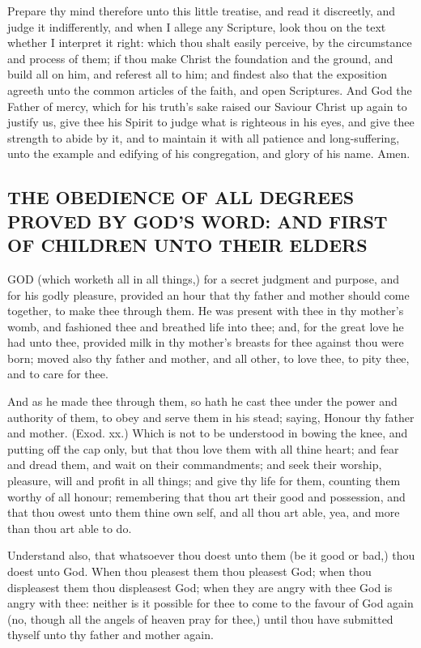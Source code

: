 Prepare thy mind therefore unto this little treatise, and 
read it discreetly, and judge it indifferently, and when I
allege any Scripture, look thou on the text whether I interpret
it right: which thou shalt easily perceive, by the circumstance
and process of them; if thou make Christ the 
foundation and the ground, and build all on him, and referest
all to him; and findest also that the exposition 
agreeth unto the common articles of the faith, and open 
Scriptures. And God the Father of mercy, which for his 
truth's sake raised our Saviour Christ up again to justify 
us, give thee his Spirit to judge what is righteous in his 
eyes, and give thee strength to abide by it, and to maintain
it with all patience and long-suffering, unto the 
example and edifying of his congregation, and glory of his 
name. Amen. 


\subsection*{THE OBEDIENCE OF ALL DEGREES PROVED BY GOD'S WORD: AND FIRST OF
CHILDREN UNTO THEIR ELDERS}

GOD (which worketh all in all things,) for a secret 
judgment and purpose, and for his godly pleasure, 
provided an hour that thy father and mother should come 
together, to make thee through them. He was present 
with thee in thy mother's womb, and fashioned thee 
and breathed life into thee; and, for the great love he had 
unto thee, provided milk in thy mother's breasts for thee 
against thou were born; moved also thy father and 
mother, and all other, to love thee, to pity thee, and to 
care for thee. 

And as he made thee through them, so hath he cast thee 
under the power and authority of them, to obey and serve 
them in his stead; saying, Honour thy father and mother. 
(Exod. xx.) Which is not to be understood in bowing 
the knee, and putting off the cap only, but that thou love 
them with all thine heart; and fear and dread them, and 
wait on their commandments; and seek their worship,
pleasure, will and profit in all things; and give thy life for 
them, counting them worthy of all honour; remembering 
that thou art their good and possession, and that thou 
owest unto them thine own self, and all thou art able, yea, 
and more than thou art able to do.

Understand also, that whatsoever thou doest unto them 
(be it good or bad,) thou doest unto God. When thou 
pleasest them thou pleasest God; when thou displeasest 
them thou displeasest God; when they are angry with 
thee God is angry with thee: neither is it possible for 
thee to come to the favour of God again (no, though 
all the angels of heaven pray for thee,) until thou have 
submitted thyself unto thy father and mother again. 

